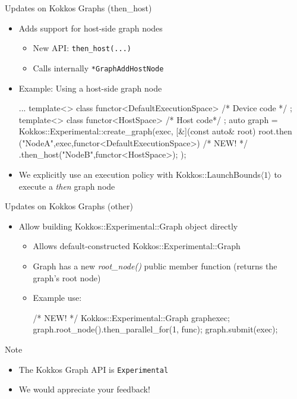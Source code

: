 
\begin{frame}[fragile]{Updates on Kokkos Graphs (then\_host)}
 \begin{itemize}
     \item Adds support for host-side graph nodes    
    \begin{itemize}
      \item New API: \texttt{then\_host(...)}
      \item Calls internally \texttt{*GraphAddHostNode}
    \end{itemize}
 \item Example: Using a host-side graph node
        \begin{code}[keywords={std}]
    ...
    template<>
    class functor<DefaultExecutionSpace>{ /* Device code */ };
    template<>
    class functor<HostSpace> { /* Host code*/ };
    auto graph = Kokkos::Experimental::create_graph(exec, 
        [&](const auto& root) {
          root.then ("NodeA",exec,functor<DefaultExecutionSpace>{})
          /* NEW! */
          .then_host("NodeB",functor<HostSpace>{});
    });      
      \end{code}
  
  \item We explicitly use an execution policy with Kokkos::LaunchBounds$\langle 1\rangle$ to execute a \emph{then} graph node
 \end{itemize}
\end{frame}


\begin{frame}[fragile]{Updates on Kokkos Graphs (other)}
 \begin{itemize}
    \item Allow building Kokkos::Experimental::Graph object directly
    \begin{itemize}
    \item Allows default-constructed Kokkos::Experimental::Graph 
    \item Graph has a new \emph{root\_node()} public member function (returns the graph's root node)
    \item Example use:
     \begin{code}[keywords={std}]
      /* NEW! */
      Kokkos::Experimental::Graph graph{exec};
      graph.root_node().then_parallel_for(1, func{});
      graph.submit(exec);
        \end{code}
     \end{itemize}
 \end{itemize}
   \begin{block}{Note}
 \begin{itemize}
   \item The Kokkos Graph API is \texttt{Experimental}
   \item We would appreciate your feedback!
 \end{itemize}
  \end{block}
\end{frame}


